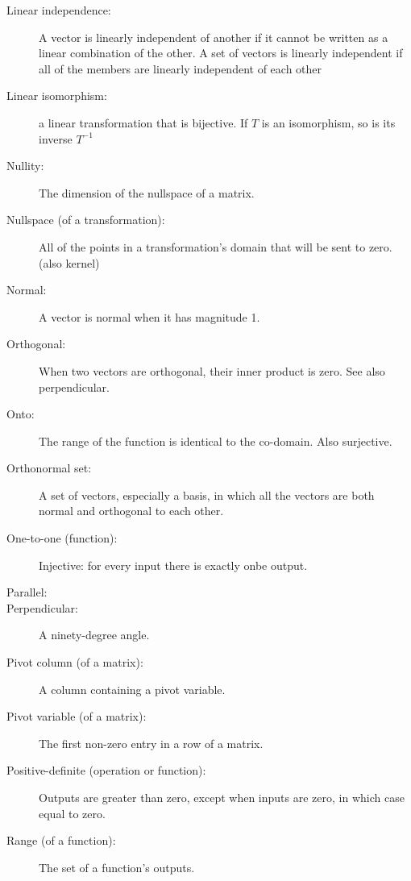 \begin{description}
			\item[Linear independence:] A vector is linearly independent of another if it cannot be written as a linear combination of the other. A set of vectors is linearly independent if all of the members are linearly independent of each other
			
			\item[Linear isomorphism:] a linear transformation that is bijective. If $T$ is an isomorphism, so is its inverse $T^{-1}$
			
			\item[Nullity:] The dimension of the nullspace of a matrix.
			
			\item[Nullspace (of a transformation):] All of the points in a transformation's domain that will be sent to zero. (also kernel)
			
			\item[Normal:] A vector is normal when it has magnitude 1.
			
			\item[Orthogonal:] When two vectors are orthogonal, their inner product is zero. See also perpendicular.
			
			\item[Onto:] The range of the function is identical to the co-domain. Also surjective.
			
			\item[Orthonormal set:] A set of vectors, especially a basis, in which all the vectors are both normal and orthogonal to each other.
			
			\item[One-to-one (function):] Injective: for every input there is exactly onbe output.
			
			\item[Parallel:] 
			
			\item[Perpendicular:] A ninety-degree angle.
			
			\item[Pivot column (of a matrix):] A column containing a pivot variable.
			
			\item[Pivot variable (of a matrix):] The first non-zero entry in a row of a matrix.
			
			\item[Positive-definite (operation or function): ] Outputs are greater than zero, except when inputs are zero, in which case equal to zero.
			
			\item[Range (of a function):] The set of a function's outputs.
			

\end{description}
